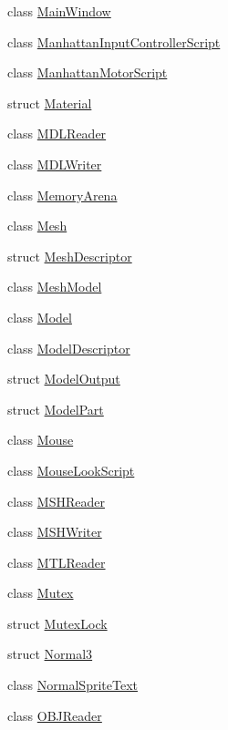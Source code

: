 \begin{DoxyCompactItemize}
\item 
class \hyperlink{classmage_1_1_main_window}{Main\+Window}
\item 
class \hyperlink{classmage_1_1_manhattan_input_controller_script}{Manhattan\+Input\+Controller\+Script}
\item 
class \hyperlink{classmage_1_1_manhattan_motor_script}{Manhattan\+Motor\+Script}
\item 
struct \hyperlink{structmage_1_1_material}{Material}
\item 
class \hyperlink{classmage_1_1_m_d_l_reader}{M\+D\+L\+Reader}
\item 
class \hyperlink{classmage_1_1_m_d_l_writer}{M\+D\+L\+Writer}
\item 
class \hyperlink{classmage_1_1_memory_arena}{Memory\+Arena}
\item 
class \hyperlink{classmage_1_1_mesh}{Mesh}
\item 
struct \hyperlink{structmage_1_1_mesh_descriptor}{Mesh\+Descriptor}
\item 
class \hyperlink{classmage_1_1_mesh_model}{Mesh\+Model}
\item 
class \hyperlink{classmage_1_1_model}{Model}
\item 
class \hyperlink{classmage_1_1_model_descriptor}{Model\+Descriptor}
\item 
struct \hyperlink{structmage_1_1_model_output}{Model\+Output}
\item 
struct \hyperlink{structmage_1_1_model_part}{Model\+Part}
\item 
class \hyperlink{classmage_1_1_mouse}{Mouse}
\item 
class \hyperlink{classmage_1_1_mouse_look_script}{Mouse\+Look\+Script}
\item 
class \hyperlink{classmage_1_1_m_s_h_reader}{M\+S\+H\+Reader}
\item 
class \hyperlink{classmage_1_1_m_s_h_writer}{M\+S\+H\+Writer}
\item 
class \hyperlink{classmage_1_1_m_t_l_reader}{M\+T\+L\+Reader}
\item 
class \hyperlink{classmage_1_1_mutex}{Mutex}
\item 
struct \hyperlink{structmage_1_1_mutex_lock}{Mutex\+Lock}
\item 
struct \hyperlink{structmage_1_1_normal3}{Normal3}
\item 
class \hyperlink{classmage_1_1_normal_sprite_text}{Normal\+Sprite\+Text}
\item 
class \hyperlink{classmage_1_1_o_b_j_reader}{O\+B\+J\+Reader}
\item 

\end{DoxyCompactItemize}
